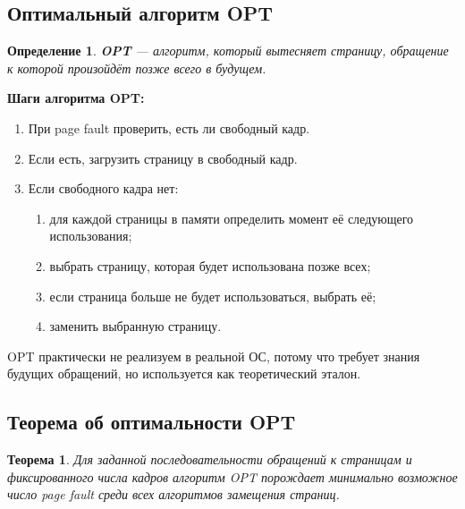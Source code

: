 \documentclass[a4paper,12pt]{article}
\newtheorem{definition}{Определение}
\newtheorem{theorem}{Теорема}
\begin{document}
\subsection{Оптимальный алгоритм OPT}

\begin{definition}
\textbf{OPT} --- алгоритм, который вытесняет страницу, обращение к которой произойдёт позже всего в будущем.
\end{definition}

\textbf{Шаги алгоритма OPT:}

\begin{enumerate}
    \item При page fault проверить, есть ли свободный кадр.
    \item Если есть, загрузить страницу в свободный кадр.
    \item Если свободного кадра нет:
    \begin{enumerate}
        \item для каждой страницы в памяти определить момент её следующего использования;
        \item выбрать страницу, которая будет использована позже всех;
        \item если страница больше не будет использоваться, выбрать её;
        \item заменить выбранную страницу.
    \end{enumerate}
\end{enumerate}

OPT практически не реализуем в реальной ОС, потому что требует знания будущих обращений, но используется как теоретический эталон.

\subsection{Теорема об оптимальности OPT}

\begin{theorem}
Для заданной последовательности обращений к страницам и фиксированного числа кадров алгоритм OPT порождает минимально возможное число page fault среди всех алгоритмов замещения страниц.
\end{theorem}
\end{document}

